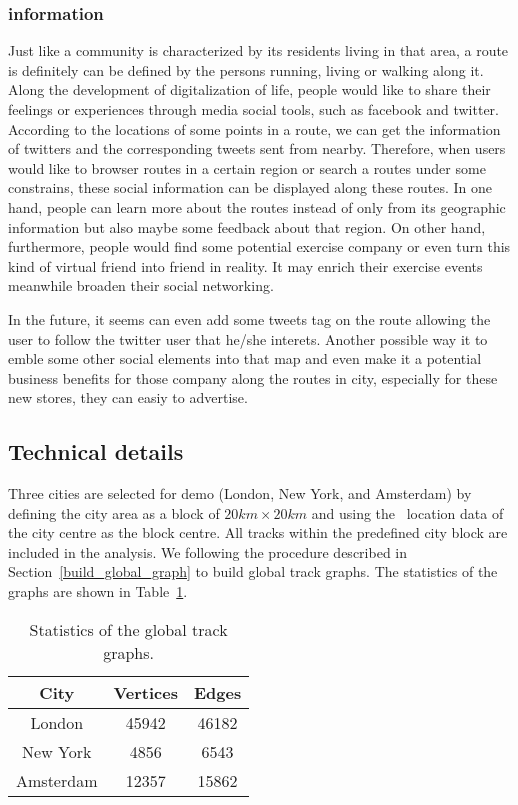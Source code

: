\subsubsection{\twitter information}

Just like a community is characterized by its residents living in that area, a route is definitely can be defined by the persons running, living or walking along it.
Along the development of digitalization of life, people would like to share their feelings or experiences through media social tools, such as facebook and twitter.
According to the locations of some points in a route, we can get the information of twitters and the corresponding tweets sent from nearby.
Therefore, when users would like to browser routes in a certain region or search a routes under some constrains, these social information can be displayed along these routes.
In one hand, people can learn more about the routes instead of only from its geographic information but also maybe some feedback about that region.
On other hand, furthermore, people would find some potential exercise company or even turn this kind of virtual friend into friend in reality.
It may enrich their exercise events meanwhile broaden their social networking.

In the future, it seems can even add some tweets tag on the route allowing the user to follow the twitter user that he/she interets. Another possible way it to emble some other social elements into that map and even make it a potential business benefits for those company along the routes in city, especially for these new stores, they can easiy to advertise.


\subsection{Technical details}

Three cities are selected for demo (London, New York, and Amsterdam) by defining the city area as a block of $20km\times20km$ and using the \gps\ location data of the city centre as the block centre.
All tracks within the predefined city block are included in the analysis.
We following the procedure described in Section~\ref{build_global_graph} to build global track graphs.
The statistics of the graphs are shown in Table~\ref{graph_statistics}.

\begin{table}
	\begin{center}
		\begin{tabular}{|c||c|c|}\hline
			City & Vertices & Edges  \\ \hline \hline
			London & 45942 & 46182\\ \hline
			New York & 4856 & 6543\\ \hline
			Amsterdam & 12357 & 15862 \\ \hline
		\end{tabular}
		\caption{Statistics of the global track graphs.}
		\label{graph_statistics}
	\end{center}
\end{table}










